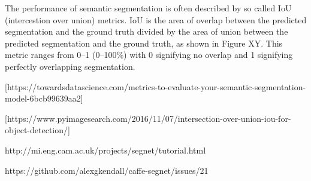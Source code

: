 The performance of semantic segmentation is often described by so called IoU (intercestion over union) metrics. IoU is the area of overlap between the predicted segmentation and the ground truth divided by the area of union between the predicted segmentation and the ground truth, as shown in Figure XY. This metric ranges from 0–1 (0–100\%) with 0 signifying no overlap and 1 signifying perfectly overlapping segmentation.

[https://towardsdatascience.com/metrics-to-evaluate-your-semantic-segmentation-model-6bcb99639aa2]

[https://www.pyimagesearch.com/2016/11/07/intersection-over-union-iou-for-object-detection/]

http://mi.eng.cam.ac.uk/projects/segnet/tutorial.html

https://github.com/alexgkendall/caffe-segnet/issues/21